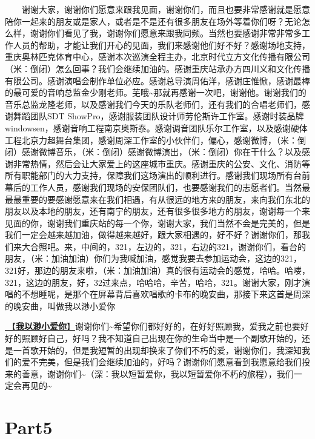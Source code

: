 \documentclass[]{ctexbook}
\begin{document}
  谢谢大家，谢谢你们愿意来跟我见面，谢谢你们，而且也要非常感谢就是愿意陪你一起来的朋友或是家人，或者是不是还有很多朋友在场外等着你们呀？无论怎么样，谢谢你们看见了我，谢谢你们愿意来跟我同频。当然也要感谢非常非常多工作人员的帮助，才能让我们开心的见面，我们来感谢他们好不好？感谢场地支持，重庆奥林匹克体育中心，感谢本次巡演全程主办，北京时代立方文化传播有限公司（米：倒闭）怎么回事？我们会继续加油的。感谢重庆站承办方四川义和文化传播有限公司。感谢演唱会制作单位必应。感谢总导演周佑洋，感谢庄惟惞，感谢最棒的最可爱的音响总监金少刚老师。芜哦\textasciitilde 那就再感谢一次吧，谢谢他。谢谢我们的音乐总监龙隆老师，以及感谢我们今天的乐队老师们，还有我们的合唱老师们，感谢舞蹈团队SDT ShowPro，感谢服装团队设计师劳伦斯许工作室。感谢时装品牌windowsen，感谢音响工程南京奥斯泰。感谢调音团队乐尔工作室，以及感谢硬体工程北京力超舞台集团，感谢周深工作室的小伙伴们，偏心，感谢微博，（米：倒闭）感谢微博音乐，（米：倒闭）感谢微博演出，（米：倒闭）你在干什么？以及感谢非常热情，然后会让大家爱上的这座城市重庆。感谢重庆的公安、文化、消防等所有职能部门的大力支持，保障我们这场演出的顺利进行。感谢我们现场所有台前幕后的工作人员，感谢我们现场的安保团队们，也要感谢我们的志愿者们。当然最最最重要的要感谢愿意来在我们相遇，有从很远的地方来的朋友，来向我们东北的朋友以及本地的朋友，还有南宁的朋友，还有很多很多地方的朋友，谢谢每一个来见面的你，谢谢我们重庆站的每一个你，谢谢大家，我们当然不会是完美的，但是我们一定会越来越加油，做得越来越好，跟大家相遇的，好不好？谢谢你们，那我们来大合照吧。来，中间的，321，左边的，321，右边的321，谢谢你们，看台的朋友，（米：加油加油）你们为我喊加油，感觉我要去参加运动会，这边的321，321好，那边的朋友来啦，（米：加油加油）真的很有运动会的感觉，哈哈。哈喽，321，这边的朋友，好，32过来点，哈哈哈，辛苦，哈哈，321。谢谢大家，刚才演唱的不想睡呢，是那个在屏幕背后喜欢唱歌的卡布的晚安曲，那接下来这首是周深的晚安曲，叫做我以渺小爱你

\hyperref[loving-you-in-my-humble-way]{🎵【\textbf{我以渺小爱你}】}谢谢你们\textasciitilde 希望你们都好好的，在好好照顾我，爱我之前也要好好的照顾好自己，好吗？我不知道自己出现在你的生命当中是一个副歌开始的，还是一首歌开始的，但是我短暂的出现却换来了你们不朽的爱，谢谢你们，我深知我们的爱不完美，但是我们会继续加油的，好吗？谢谢你们愿意看到我愿意给我们投来的善意，谢谢你们\textasciitilde（深：我以短暂爱你，我以短暂爱你不朽的旅程），我们一定会再见的\textasciitilde{}

\section{Part5}\label{chongqing-20241006-part5}
\end{document}
